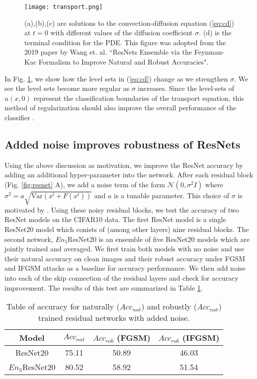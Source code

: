 \documentclass[12pt]{article}
\begin{document}
\begin{figure}
  \centering
  \texttt{[image: transport.png]}
  \caption{(a),(b),(c) are solutions to the convection-diffusion equation (\ref{eq:cd}) at $t=0$ with different values of the diffusion coefficient $\sigma$. (d) is the terminal condition for the PDE. This figure was adopted from the 2019 paper by Wang et. al. ``ResNets Ensemble via the Feynman-Kac Formalism to Improve Natural and Robust Accuracies"\cite{res}.}
  \label{fig:transport}
\end{figure}
In Fig. \ref{fig:transport}, we show how the level sets in (\ref{eq:cd}) change as we strengthen $\sigma$. We see the level sets become more regular as $\sigma$ increases. Since the level-sets of $u(x,0)$ represent the classification boundaries of the transport equation, this method of regularization should also improve the overall performance of the classifier \cite{res}.
\subsection{Added noise improves robustness of ResNets}
Using the above discussion as motivation, we improve the ResNet accuracy by adding an additional hyper-parameter into the network. After each residual block (Fig. \ref{fig:resnet} A), we add a noise term of the form $\mathcal{N}(0,\sigma^2 I)$ where $\sigma^2 = a\sqrt{\text{Var}(x^l + F(x^l))}$ and $a$ is a tunable parameter. This choice of $\sigma$ is motivated by \cite{res}. Using these noisy residual blocks, we test the accuracy of two ResNet models on the CIFAR10 data. The first ResNet model is a single ResNet20 model which conists of (among other layers) nine residual blocks. The second network, $En_5$ResNet20 is an ensemble of five ResNet20 models which are jointly trained and averaged. We first train both models with no noise and use their natural accuracy on clean images and their robust accuracy under FGSM and IFGSM attacks as a baseline for accuracy performance. We then add noise into each of the skip connection of the residual layers and check for accuracy improvement. The results of this test are summarized in Table \ref{tab:enres}.
\begin{table}
  \centering
\begin{tabular}{|c|c|c|c|}
  \hline
                Model    & $Acc_{nat}$ & $Acc_{rob}$ (FGSM) &  $Acc_{rob}$ (IFGSM) \\
                      \hline
ResNet20 & 75.11  & 50.89 & 46.03   \\
  \hline
$En_5$ResNet20  & 80.52  & 58.92  & 51.54    \\
  \hline
\end{tabular}
\caption{Table of accuracy for naturally ($Acc_{nat}$) and robustly ($Acc_{nat}$) trained residual networks with added noise.}
\label{tab:enres}
\end{table}
\end{document}
